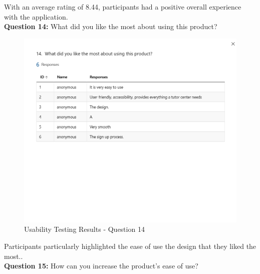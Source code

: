 \begin{justify}
\vspace{0.25cm}
\newendline With an average rating of 8.44, participants had a positive overall experience with the application.\\

\clearpage
\vspace{0.25cm}
\newendline \textbf{Question 14:} What did you like the most about using this product?

\begin{figure}[H]
    \centerline{\includegraphics[width=150mm,scale=1]{figures/implementation_and_testing/testing/MUT/answers/Answers (14).png}}
    \caption{Usability Testing Results - Question 14}
    \label{Usability Testing Results - Question 14}
\end{figure}

\vspace{0.25cm}
\newendline Participants particularly highlighted the ease of use the design that they liked the most..\\

\clearpage
\vspace{0.25cm}
\newendline \textbf{Question 15:} How can you increase the product’s ease of use?


\end{justify}
